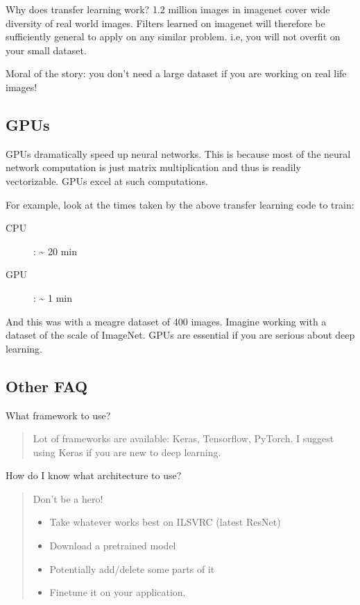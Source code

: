 \documentclass[a4paper]{tufte-handout}
\begin{document}
Why does transfer learning work? 1.2 million images in imagenet cover
wide diversity of real world images. Filters learned on imagenet will
therefore be sufficiently general to apply on any similar problem. i.e,
you will not overfit on your small dataset.

Moral of the story: you don't need a large dataset if you are working on
real life images!

\subsection{GPUs}\label{gpus}

GPUs dramatically speed up neural networks. This is because most of the
neural network computation is just matrix multiplication and thus is
readily vectorizable. GPUs excel at such computations.

For example, look at the times taken by the above transfer learning code to
train:

\begin{description}
\item[CPU]: \textasciitilde{} 20 min
\item[GPU]: \textasciitilde{} 1 min
\end{description}

And this was with a meagre dataset of 400 images. Imagine working with a
dataset of the scale of ImageNet. GPUs are essential if you are serious
about deep learning.

\subsection{Other FAQ}\label{other-faq}

\noindent What framework to use?

\begin{quote}
Lot of frameworks are available: Keras, Tensorflow, PyTorch. I suggest
using Keras if you are new to deep learning.
\end{quote}

\noindent How do I know what architecture to use?

\begin{quote}
Don't be a hero!

\begin{itemize}
\item
  Take whatever works best on ILSVRC (latest ResNet)
\item
  Download a pretrained model
\item
  Potentially add/delete some parts of it
\item
  Finetune it on your application.
\end{itemize}
\end{quote}
\end{document}
